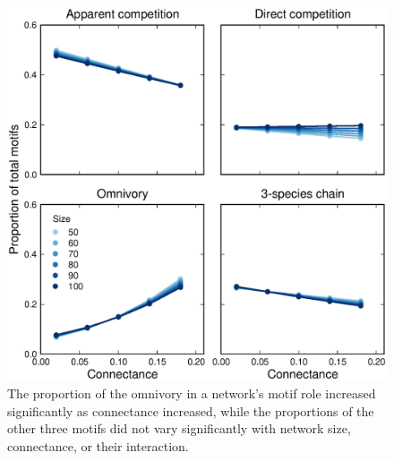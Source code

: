 \documentclass[12pt]{article}
\begin{document}
\begin{spacing}{2.0}
    \begin{figure}[hb!]
        \centering
        \includegraphics[width=\textwidth]{figures/motif_proportion_lms.eps}
        \caption{The proportion of the omnivory in a network's motif role increased significantly as connectance increased, while the proportions of the other three motifs did not vary significantly with network size, connectance, or their interaction.}
        \label{motif_proportion_lms}
    \end{figure}    
    
    

\end{spacing}
\end{document}
